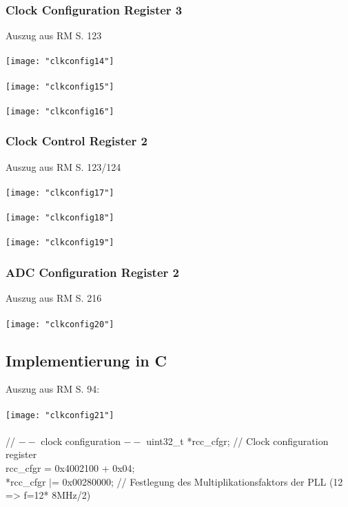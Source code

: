 \documentclass[11pt]{report}
\begin{document}
			\subsubsection{Clock Configuration Register 3}
				Auszug aus RM S. 123\\
				\\\texttt{[image: "clkconfig14"]}\\
				\\\texttt{[image: "clkconfig15"]}\\
				\\\texttt{[image: "clkconfig16"]}\\
			\subsubsection{Clock Control Register 2}
				Auszug aus RM S. 123/124\\
				\\\texttt{[image: "clkconfig17"]}\\
				\\\texttt{[image: "clkconfig18"]}\\
				\\\texttt{[image: "clkconfig19"]}\\
			\subsubsection{ADC Configuration Register 2}
				Auszug aus RM S. 216\\
				\\\texttt{[image: "clkconfig20"]}\\
		\subsection{Implementierung in C}
			Auszug aus RM S. 94:\\
			\\\texttt{[image: "clkconfig21"]}\\
			\\// $--$ clock configuration $--$
	uint32\_t *rcc\_cfgr; // Clock configuration register\\
	rcc\_cfgr = 0x4002100 + 0x04;\\
	*rcc\_cfgr $|$= 0x00280000; // Festlegung des Multiplikationsfaktors der PLL (12 => f=12* 8MHz/2)\\
\end{document}
